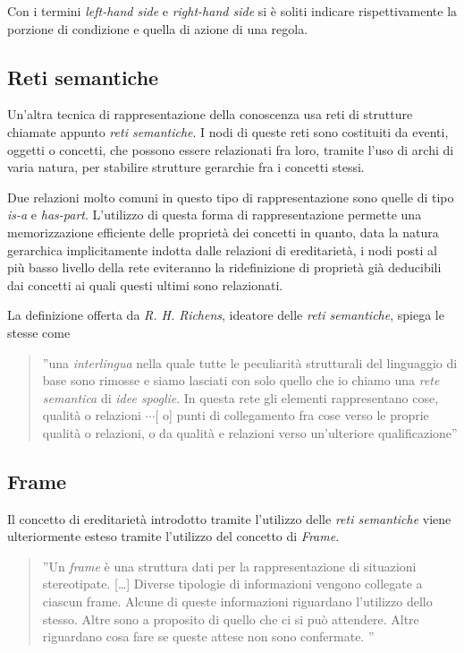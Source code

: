 Con i termini \emph{left-hand side} e \emph{right-hand side} si è soliti indicare rispettivamente la porzione di condizione e quella di azione di una regola.

\subsection{Reti semantiche}
Un'altra tecnica di rappresentazione della conoscenza usa reti di strutture chiamate appunto \emph{reti semantiche}. I nodi di queste reti sono costituiti da eventi, oggetti o concetti, che possono essere relazionati fra loro, tramite l'uso di archi di varia natura, per stabilire strutture gerarchie fra i concetti stessi. \cite{development1993}

Due relazioni molto comuni in questo tipo di rappresentazione sono quelle di tipo \emph{is-a} e \emph{has-part}. L'utilizzo di questa forma di rappresentazione permette una memorizzazione efficiente delle proprietà dei concetti in quanto, data la natura gerarchica implicitamente indotta dalle relazioni di ereditarietà, i nodi posti al più basso livello della rete eviteranno la ridefinizione di proprietà già deducibili dai concetti ai quali questi ultimi sono relazionati.

La definizione offerta da \emph{R. H. Richens}, ideatore delle \emph{reti semantiche}, spiega le stesse come
\begin{quote}
''una \emph{interlingua} nella quale tutte le peculiarità strutturali del linguaggio di base sono rimosse e siamo lasciati con solo quello che io chiamo una \emph{rete semantica} di \emph{idee spoglie}. In questa rete gli elementi rappresentano cose, qualità o relazioni $\cdots$[ o] punti di collegamento fra cose verso le proprie qualità o relazioni, o da qualità e relazioni verso un'ulteriore qualificazione''\cite{richens1956}
\end{quote}

\subsection{Frame}
Il concetto di ereditarietà introdotto tramite l'utilizzo delle \emph{reti semantiche} viene ulteriormente esteso tramite l'utilizzo del concetto di \emph{Frame}. 
\begin{quote}
''Un \emph{frame} è una struttura dati per la rappresentazione di situazioni stereotipate. [\dots] Diverse tipologie di informazioni vengono collegate a ciascun frame. Alcune di queste informazioni riguardano l'utilizzo dello stesso. Altre sono a proposito di quello che ci si può attendere. Altre riguardano cosa fare se queste attese non sono confermate. \cite{minsky1974}''
\end{quote}

